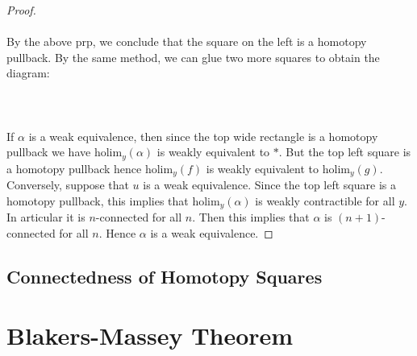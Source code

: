\documentclass[a4paper]{article}
\begin{document}
\begin{prp}{}{}
\begin{proof}
\\~\\
By the above prp, we conclude that the square on the left is a homotopy pullback. By the same method, we can glue two more squares to obtain the diagram: \\~\\
\\~\\
If $\alpha$ is a weak equivalence, then since the top wide rectangle is a homotopy pullback we have $\text{holim}_y(\alpha)$ is weakly equivalent to $\ast$. But the top left square is a homotopy pullback hence $\text{holim}_y(f)$ is weakly equivalent to $\text{holim}_y(g)$. Conversely, suppose that $u$ is a weak equivalence. Since the top left square is a homotopy pullback, this implies that $\text{holim}_y(\alpha)$ is weakly contractible for all $y$. In articular it is $n$-connected for all $n$. Then this implies that $\alpha$ is $(n+1)$-connected for all $n$. Hence $\alpha$ is a weak equivalence. 
\end{proof}
\end{prp}

\subsection{Connectedness of Homotopy Squares}

\pagebreak
\section{Blakers-Massey Theorem}
\end{document}

